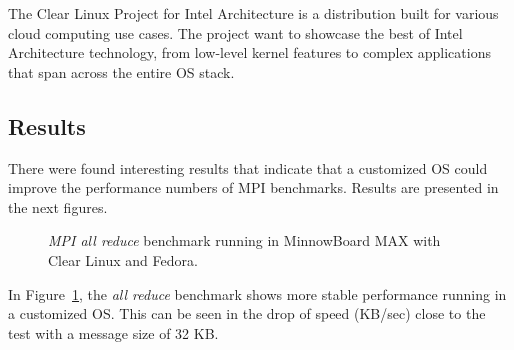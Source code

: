 The Clear Linux Project for Intel Architecture \cite{clear-linux} is a
distribution built for various cloud computing use cases. The project  want to showcase
the best of Intel Architecture technology, from low-level kernel features to
complex applications that span across the entire OS stack.

\subsection{Results}

There were found interesting results that indicate that a customized OS could 
improve the performance numbers of MPI benchmarks. Results are presented in the
next figures.



\begin{figure}[H]
\begin{center}
\end{center}
\caption{\textit{MPI all reduce} benchmark running in MinnowBoard MAX with Clear Linux and
Fedora.}
\label{mpi_allreduce_clr_fedora}
\end{figure}

In Figure~\ref{mpi_allreduce_clr_fedora}, the \textit{all reduce} benchmark
shows more stable performance running in a customized OS. This can be seen in
the drop of speed (KB/sec) close to the test with a message size of 32 KB. 

